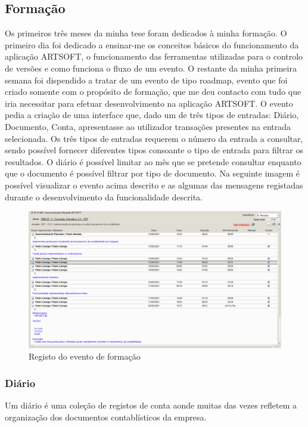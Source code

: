 \documentclass[sigplan]{acmart}
\begin{document}
\subsection{Formação}

Os primeiros três meses da minha tese foram dedicados à minha formação. O primeiro dia foi dedicado a ensinar-me os conceitos básicos do funcionamento da aplicação ARTSOFT, o funcionamento das ferramentas utilizadas para o controlo de versões e como funciona o fluxo de um evento. O restante da minha primeira semana foi dispendido a tratar de um evento de tipo roadmap, evento que foi criado somente com o propósito de formação, que me deu contacto com tudo que iria necessitar para efetuar desenvolvimento na aplicação ARTSOFT. O evento pedia a criação de uma interface que, dado um de três tipos de entradas: Diário, Documento, Conta, apresentasse ao utilizador transações presentes na entrada selecionada. Os três tipos de entradas requerem o número da entrada a consultar, sendo possível fornecer diferentes tipos consoante o tipo de entrada para filtrar os resultados. O diário é possível limitar ao mês que se pretende consultar enquanto que o documento é possível filtrar por tipo de documento. Na seguinte imagem é possível visualizar o evento acima descrito e as algumas das mensagens registadas durante o desenvolvimento da funcionalidade descrita.
\begin{figure}[htbp]
	\centerline{\includegraphics[width=\linewidth]{figures/evento_formacao.png}}
	\caption{Registo do evento de formação}
	\label{fig2}
\end{figure}

\subsubsection{Diário}

Um diário é uma coleção de registos de conta aonde muitas das vezes refletem a organização dos documentos contablísticos da empresa.
\end{document}
